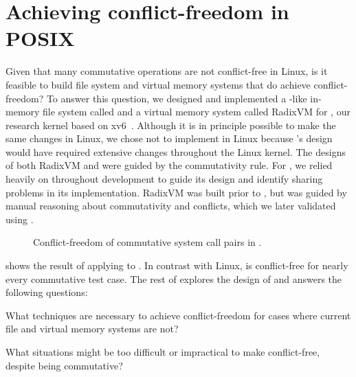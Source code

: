 \section{Achieving conflict-freedom in POSIX}
\label{sec:sv6}


Given that many commutative operations are not conflict-free in Linux,
is it feasible to build file system and virtual memory systems that
do achieve conflict-freedom?
%
To answer this
question, we designed and implemented a -like in-memory
file system called \fs and a virtual memory system called RadixVM for
\sys, our research kernel based on xv6~\cite{xv6}.
%
Although it is in principle possible to make the same changes in Linux,
we chose not to implement \fs in Linux because \fs's design
would have required extensive changes throughout the Linux kernel.
%
The designs of both RadixVM and \fs were guided by the
commutativity rule.  For \fs, we relied heavily on \tool throughout
development to guide its design and identify sharing problems in its
implementation.  RadixVM
was built prior to
\tool, but was guided by manual reasoning about commutativity and
conflicts, which we later validated using \tool.

\begin{figure*}
\small
\centering
{}
\caption{Conflict-freedom of commutative system call pairs in \sys.}
\label{fig:testcase-breakdown-sv6}
\end{figure*}

 shows the result of applying \tool
to \sys.  In contrast with Linux, \sys is conflict-free for nearly
every commutative test case.  The rest of  explores the
design of \sys and answers the following questions:

\begin{CompactItemize}

\item What techniques are necessary to achieve conflict-freedom for
      cases where current file and virtual memory systems are not?

\item What situations might be too difficult or impractical to
      make conflict-free, despite being commutative?

\end{CompactItemize}

